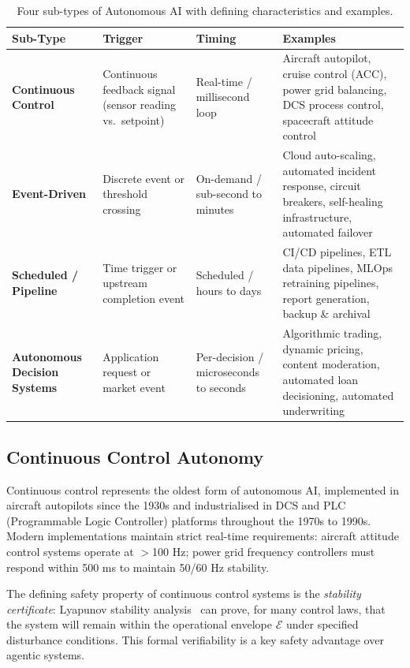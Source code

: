 \documentclass[12pt, a4paper]{article}
\begin{document}
\begin{table}[ht]
\centering
\caption{Four sub-types of Autonomous AI with defining characteristics and examples.}
\label{tab:subtypes}
\begin{tabular}{lp{4cm}p{3.5cm}p{4cm}}
\toprule
\textbf{Sub-Type} & \textbf{Trigger} & \textbf{Timing} & \textbf{Examples} \\
\midrule
\textbf{Continuous Control}
  & Continuous feedback signal (sensor reading vs.\ setpoint)
  & Real-time / millisecond loop
  & Aircraft autopilot, cruise control (ACC), power grid balancing, DCS process control, spacecraft attitude control \\
\addlinespace
\textbf{Event-Driven}
  & Discrete event or threshold crossing
  & On-demand / sub-second to minutes
  & Cloud auto-scaling, automated incident response, circuit breakers, self-healing infrastructure, automated failover \\
\addlinespace
\textbf{Scheduled / Pipeline}
  & Time trigger or upstream completion event
  & Scheduled / hours to days
  & CI/CD pipelines, ETL data pipelines, MLOps retraining pipelines, report generation, backup \& archival \\
\addlinespace
\textbf{Autonomous Decision Systems}
  & Application request or market event
  & Per-decision / microseconds to seconds
  & Algorithmic trading, dynamic pricing, content moderation, automated loan decisioning, automated underwriting \\
\bottomrule
\end{tabular}
\end{table}

\subsection{Continuous Control Autonomy}
Continuous control represents the oldest form of autonomous AI, implemented in aircraft autopilots since the 1930s and industrialised in DCS and PLC (Programmable Logic Controller) platforms throughout the 1970s to 1990s. Modern implementations maintain strict real-time requirements: aircraft attitude control systems operate at $>$100 Hz; power grid frequency controllers must respond within 500 ms to maintain 50/60 Hz stability.

The defining safety property of continuous control systems is the \emph{stability certificate}: Lyapunov stability analysis~\citep{lyapunov1892} can prove, for many control laws, that the system will remain within the operational envelope $\mathcal{E}$ under specified disturbance conditions. This formal verifiability is a key safety advantage over agentic systems.
\end{document}

